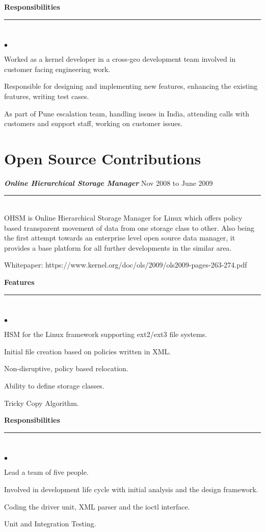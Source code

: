 \documentclass[letterpaper,margin,line]{RES}
\newenvironment{list2}{
  \begin{list}{$\bullet$}{%
      \setlength{\itemsep}{1pt}
      \setlength{\parsep}{0in} \setlength{\parskip}{0in}
      \setlength{\topsep}{0in} \setlength{\partopsep}{0in} 
      \setlength{\leftmargin}{0.2in}}}{\end{list}}
\def\myline{\\\rule{\textwidth}{1pt}\\}
\def\mmyline{\\\rule{\textwidth}{.5pt}\\}
\begin{document}
\begin{resume}
{ \bf Responsibilities}
\mmyline
	\begin{list2}
    \item Worked as a kernel developer in a cross-geo development team involved in customer facing engineering work.
    \item Responsible for designing and implementing new features, enhancing the existing features, writing test cases.
    \item As part of Pune escalation team, handling issues in India, attending calls with customers and support staff, working on customer issues. 
    \end{list2}

\section{\sc Open Source Contributions }
{\sl \bf Online Hierarchical Storage Manager } \hfill Nov 2008 to June 2009 
\myline
    OHSM is Online Hierarchical Storage Manager for Linux which offers policy based transparent movement of data from one storage class to other. Also being the first attempt towards an enterprise level open source data manager, it provides a base platform for all further developments in the similar area.

    Whitepaper: https://www.kernel.org/doc/ols/2009/ols2009-pages-263-274.pdf    

{\bf Features }
\mmyline
\begin{list2}
    \item   HSM for the Linux framework supporting ext2/ext3 file systems.
    \item   Initial file creation based on policies written in XML.
    \item   Non-disruptive, policy based relocation.
    \item   Ability to define storage classes.
    \item   Tricky Copy Algorithm.
    \end{list2} 

{\bf Responsibilities }
\mmyline
\begin{list2}
    \item     Lead a team of five people.
    \item     Involved in development life cycle with initial analysis and the design framework.
    \item     Coding the driver unit, XML parser and the ioctl interface.
    \item     Unit and Integration Testing.
    \end{list2}


\end{resume}
\end{document}

